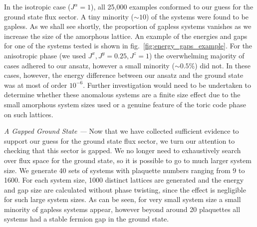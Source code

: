 In the isotropic case ($J^\alpha = 1$), all 25,000 examples conformed to our guess for the ground state flux sector. A tiny minority ($\sim 10$) of the systems were found to be gapless. As we shall see shortly, the proportion of gapless systems vanishes as we increase the size of the amorphous lattice. An example of the energies and gaps for one of the systems tested is shown in fig.~\ref{fig:energy_gaps_example}. For the anisotropic phase (we used $ J^x, J^y = 0.25, J^z = 1$) the overwhelming majority of cases adhered to our ansatz, however a small minority ($\sim 0.5 \%$) did not. In these cases, however, the energy difference between our ansatz and the ground state was at most of order $10^{-6}$. Further investigation would need to be undertaken to determine whether these anomalous systems are a finite size effect due to the small amorphous system sizes used or a genuine feature of the toric code phase on such lattices. \par

{\it A Gapped Ground State ---} Now that we have collected sufficient evidence to support our guess for the ground state flux sector, we turn our attention to checking that this sector is gapped. We no longer need to exhaustively search over flux space for the ground state, so it is possible to go to much larger system size. We generate 40 sets of systems with plaquette numbers ranging from 9 to 1600. For each system size, 1000 distinct lattices are generated and the energy and gap size are calculated without phase twisting, since the effect is negligible for such large system sizes. As can be seen, for very small system size a small minority of gapless systems appear, however beyond around 20 plaquettes all systems had a stable fermion gap in the ground state. 